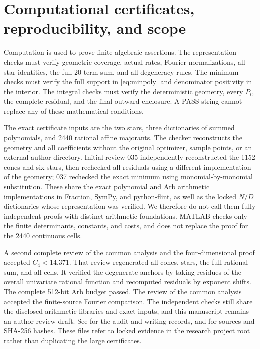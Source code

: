 \documentclass[11pt,a4paper]{article}
\theoremstyle{remark}\newtheorem{remark}[theorem]{Remark}
\newcommand{\1}{\mathbf1}\newcommand{\pos}[1]{(#1)_+}
\begin{document}
\section{Computational certificates, reproducibility, and scope}
Computation is used to prove finite algebraic assertions. The representation checks must verify geometric coverage, actual rates, Fourier normalizations, all star identities, the full 20-term sum, and all degeneracy rules. The minimum checks must verify the full support in \eqref{eq:minpoly} and denominator positivity in the interior. The integral checks must verify the deterministic geometry, every $P_i$, the complete residual, and the final outward enclosure. A PASS string cannot replace any of these mathematical conditions.

The exact certificate inputs are the two stars, three dictionaries of summed polynomials, and 2440 rational affine majorants. The checker reconstructs the geometry and all coefficients without the original optimizer, sample points, or an external author directory. Initial review 035 independently reconstructed the 1152 cones and six stars, then rechecked all residuals using a different implementation of the geometry; 037 rechecked the exact minimum using monomial-by-monomial substitution. These share the exact polynomial and Arb arithmetic implementations in Fraction, SymPy, and python-flint, as well as the locked $N/D$ dictionaries whose representation was verified. We therefore do not call them fully independent proofs with distinct arithmetic foundations. MATLAB checks only the finite determinants, constants, and costs, and does not replace the proof for the 2440 continuous cells.

A second complete review of the common analysis and the four-dimensional proof accepted $C_4<14.371$. That review regenerated all cones, stars, the full rational sum, and all cells. It verified the degenerate anchors by taking residues of the overall univariate rational function and recomputed residuals by exponent shifts. The complete 512-bit Arb budget passed. The review of the common analysis accepted the finite-source Fourier comparison. The independent checks still share the disclosed arithmetic libraries and exact inputs, and this manuscript remains an author-review draft. See  for the audit and writing records, and  for sources and SHA-256 hashes. These files refer to locked evidence in the research project root rather than duplicating the large certificates.
\end{document}
